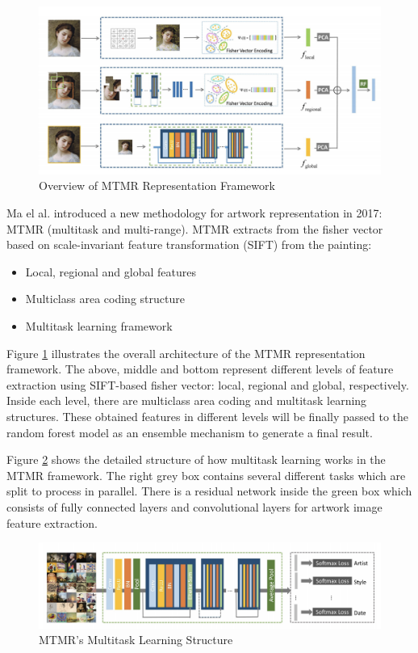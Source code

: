 \begin{figure}[h!]
\centering
\includegraphics[width=\textwidth]{MTMRoverview.pdf}
\caption{Overview of MTMR Representation Framework\cite{parttowhole}}
\label{fig:mtmroverview}
\end{figure}


Ma el al. \cite{parttowhole} introduced a new methodology for artwork representation in 2017: MTMR (multitask and multi-range). MTMR extracts from the fisher vector based on scale-invariant feature transformation (SIFT) from the painting:

\begin{itemize}
    \item Local, regional and global features
    \item Multiclass area coding structure
    \item Multitask learning framework
\end{itemize}

Figure \ref{fig:mtmroverview} illustrates the overall architecture of the MTMR representation framework. The above, middle and bottom represent different levels of feature extraction using SIFT-based fisher vector: local, regional and global, respectively. Inside each level, there are multiclass area coding and multitask learning structures. These obtained features in different levels will be finally passed to the random forest model as an ensemble mechanism to generate a final result.

Figure \ref{fig:mtmrmulti} shows the detailed structure of how multitask learning works in the MTMR framework. The right grey box contains several different tasks which are split to process in parallel. There is a residual network inside the green box which consists of fully connected layers and convolutional layers for artwork image feature extraction.


\begin{figure}[h!]
\centering
\includegraphics[width=\textwidth]{MTMRmultitask.pdf}
\caption{MTMR's Multitask Learning Structure\cite{parttowhole}}
\label{fig:mtmrmulti}
\end{figure}

